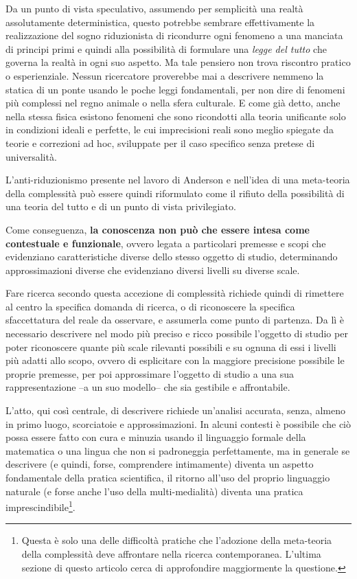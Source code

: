\documentclass[a4paper, headings=standardclasses]{scrartcl}
\begin{document}
Da un punto di vista speculativo, assumendo per semplicità una realtà assolutamente deterministica, questo potrebbe sembrare effettivamente la realizzazione del sogno riduzionista di ricondurre ogni fenomeno a una manciata di principi primi e quindi alla possibilità di formulare una \textit{legge del tutto} che governa la realtà in ogni suo aspetto. Ma tale pensiero non trova riscontro pratico o esperienziale.
Nessun ricercatore proverebbe mai a descrivere nemmeno la statica di un ponte usando le poche leggi fondamentali, per non dire di fenomeni più complessi nel regno animale o nella sfera culturale.
E come già detto, anche nella stessa fisica esistono fenomeni che sono ricondotti alla teoria unificante solo in condizioni ideali e perfette, le cui imprecisioni reali sono meglio spiegate da teorie e correzioni ad hoc, sviluppate per il caso specifico senza pretese di universalità.

L'anti-riduzionismo presente nel lavoro di Anderson e nell'idea di una meta-teoria della complessità può essere quindi riformulato come il rifiuto della possibilità di una teoria del tutto e di un punto di vista privilegiato.

Come conseguenza, \textbf{la conoscenza non può che essere intesa come contestuale e funzionale}, ovvero legata a particolari premesse e scopi che evidenziano caratteristiche diverse dello stesso oggetto di studio, determinando approssimazioni diverse che evidenziano diversi livelli su diverse scale.

Fare ricerca secondo questa accezione di complessità richiede quindi di rimettere al centro la specifica domanda di ricerca, o di riconoscere la specifica sfaccettatura del reale da osservare, e assumerla come punto di partenza.
Da lì è necessario descrivere nel modo più preciso e ricco possibile l'oggetto di studio per poter riconoscere quante più scale rilevanti possibili e su ognuna di essi i livelli più adatti allo scopo, ovvero di esplicitare con la maggiore precisione possibile le proprie premesse, per poi approssimare l'oggetto di studio a una sua rappresentazione --a un suo modello-- che sia gestibile e affrontabile.

L'atto, qui così centrale, di descrivere richiede un'analisi accurata, senza, almeno in primo luogo, scorciatoie e approssimazioni. In alcuni contesti è possibile che ciò possa essere fatto con cura e minuzia usando il linguaggio formale della matematica o una lingua che non si padroneggia perfettamente, ma in generale se descrivere (e quindi, forse, comprendere intimamente) diventa un aspetto fondamentale della pratica scientifica, il ritorno all'uso del proprio linguaggio naturale (e forse anche l'uso della multi-medialità) diventa una pratica imprescindibile\footnote{Questa è solo una delle difficoltà pratiche che l'adozione della meta-teoria della complessità deve affrontare nella ricerca contemporanea. L'ultima sezione di questo articolo cerca di approfondire maggiormente la questione.}.
\end{document}
